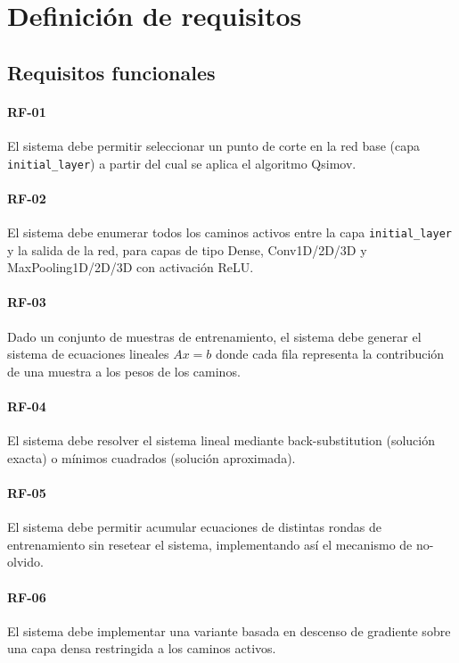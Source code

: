 
\section{Definición de requisitos}

\subsection{Requisitos funcionales}

\paragraph{RF-01} El sistema debe permitir seleccionar un punto de corte en la red base (capa
\texttt{initial\_layer}) a partir del cual se aplica el algoritmo Qsimov.

\paragraph{RF-02} El sistema debe enumerar todos los caminos activos entre la capa
\texttt{initial\_layer} y la salida de la red, para capas de tipo Dense, Conv1D/2D/3D y
MaxPooling1D/2D/3D con activación ReLU.

\paragraph{RF-03} Dado un conjunto de muestras de entrenamiento, el sistema debe generar el sistema
de ecuaciones lineales $Ax = b$ donde cada fila representa la contribución de una muestra a los
pesos de los caminos.

\paragraph{RF-04} El sistema debe resolver el sistema lineal mediante back-substitution (solución
exacta) o mínimos cuadrados (solución aproximada).

\paragraph{RF-05} El sistema debe permitir acumular ecuaciones de distintas rondas de entrenamiento
sin resetear el sistema, implementando así el mecanismo de no-olvido.

\paragraph{RF-06} El sistema debe implementar una variante basada en descenso de gradiente sobre
una capa densa restringida a los caminos activos.

